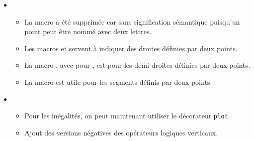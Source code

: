 \documentclass[12pt,a4paper]{book}
\begin{document}
\begin{description}
\begin{itemize}[itemsep=.5em]
\begin{itemize}[itemsep=.5em]
    		\item Les macros ,  et  ont été ajoutées.
    
     		\item {} et  servent à rédiger des dérivées avec des parenthèses extensibles. En coulisse,  et  sont appelées.
    
            Pour utiliser des parenthèses non extensibles, on passera par  et  où  est pour .
    
    		\item Ajout de  pour rendre public l'opérateur intégral proposé par défaut par \LaTeX.
        \end{itemize}
    
    
    
    
        \item {}
        \begin{itemize}[itemsep=.5em]
            \item La macro  a été supprimée car sans signification sémantique puisqu'un point peut être nommé avec deux lettres.
    
            \item Les macros  et  servent à indiquer des droites définies par deux points.
    
            \item La macro , avec  pour , est pour les demi-droites définies par deux points.
    
            \item La macro  est utile pour les segments définis par deux points.
        \end{itemize}
    
    
    
    
        \item {}
        \begin{itemize}[itemsep=.5em]
            \item Pour les inégalités, on peut maintenant utiliser le décorateur \verb+plot+.
    
    		\item Ajout des versions négatives des opérateurs logiques verticaux.
        \end{itemize}
    

\end{itemize}
\end{description}
\end{document}
